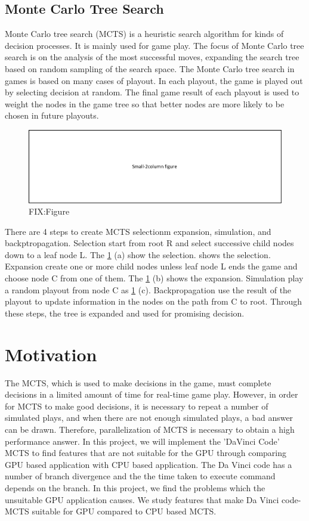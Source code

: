 \documentclass[conference]{IEEEtran}
\begin{document}
\subsection{Monte Carlo Tree Search}

Monte Carlo tree search (MCTS) is a heuristic search algorithm for kinds of decision processes.
It is mainly used for game play.  
The focus of Monte Carlo tree search is on the analysis of the most successful moves, expanding the search tree based on random sampling of the search space. 
The Monte Carlo tree search in games is based on many cases of playout. 
In each playout, the game is played out by selecting decision at random. 
The final game result of each playout is used to weight the nodes in the game tree so that better nodes are more likely to be chosen in future playouts.
\begin{figure}
\includegraphics{figures/fit_2col.pdf}
\caption{FIX:Figure}
\label{fig:MCTS_step}
\end{figure}

There are 4 steps to create MCTS selectionm expansion, simulation, and backptropagation.
Selection start from root R and select successive child nodes down to a leaf node L. The \cref{fig:MCTS_step} (a) show the selection. shows the selection.
Expansion create one or more child nodes unless leaf node L ends the game and choose node C from one of them. The \cref{fig:MCTS_step} (b) shows the expansion.
Simulation play a random playout from node C as \cref{fig:MCTS_step} (c).
Backpropagation use the result of the playout to update information in the nodes on the path from C to root. 
Through these steps, the tree is expanded and used for promising decision.

\section{Motivation}
The MCTS, which is used to make decisions in the game, must complete decisions in a limited amount of time for real-time game play. 
However, in order for MCTS to make good decisions, it is necessary to repeat a number of simulated plays, and when there are not enough simulated plays, a bad answer can be drawn. 
Therefore, parallelization of MCTS is necessary to obtain a high performance answer.
In this project, we will implement the 'DaVinci Code' MCTS to find features that are not suitable for the GPU through comparing GPU based application with CPU based application.
The Da Vinci code has a number of branch divergence and the the time taken to execute command depends on the branch.
In this project, we find the problems which the unsuitable GPU application causes.
We study features that make Da Vinci code-MCTS suitable for GPU compared to CPU based MCTS.
\end{document}
